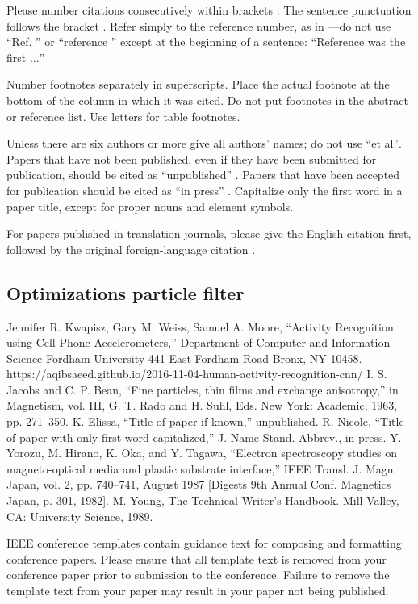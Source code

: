 \documentclass[conference]{IEEEtran}
\begin{document}
Please number citations consecutively within brackets \cite{b1}. The 
sentence punctuation follows the bracket \cite{b2}. Refer simply to the reference 
number, as in \cite{b3}---do not use ``Ref. \cite{b3}'' or ``reference \cite{b3}'' except at 
the beginning of a sentence: ``Reference \cite{b3} was the first $\ldots$''

Number footnotes separately in superscripts. Place the actual footnote at 
the bottom of the column in which it was cited. Do not put footnotes in the 
abstract or reference list. Use letters for table footnotes.

Unless there are six authors or more give all authors' names; do not use 
``et al.''. Papers that have not been published, even if they have been 
submitted for publication, should be cited as ``unpublished'' \cite{b4}. Papers 
that have been accepted for publication should be cited as ``in press'' \cite{b5}. 
Capitalize only the first word in a paper title, except for proper nouns and 
element symbols.

For papers published in translation journals, please give the English 
citation first, followed by the original foreign-language citation \cite{b6}.
\subsection*{Optimizations particle filter}
\begin{thebibliography}{00}
 Jennifer R. Kwapisz, Gary M. Weiss, Samuel A. Moore, ``Activity Recognition using Cell Phone Accelerometers,''  Department of Computer and Information Science  Fordham University  441 East Fordham Road  Bronx, NY 10458.
https://aqibsaeed.github.io/2016-11-04-human-activity-recognition-cnn/
 I. S. Jacobs and C. P. Bean, ``Fine particles, thin films and exchange anisotropy,'' in Magnetism, vol. III, G. T. Rado and H. Suhl, Eds. New York: Academic, 1963, pp. 271--350.
 K. Elissa, ``Title of paper if known,'' unpublished.
 R. Nicole, ``Title of paper with only first word capitalized,'' J. Name Stand. Abbrev., in press.
 Y. Yorozu, M. Hirano, K. Oka, and Y. Tagawa, ``Electron spectroscopy studies on magneto-optical media and plastic substrate interface,'' IEEE Transl. J. Magn. Japan, vol. 2, pp. 740--741, August 1987 [Digests 9th Annual Conf. Magnetics Japan, p. 301, 1982].
 M. Young, The Technical Writer's Handbook. Mill Valley, CA: University Science, 1989.
\end{thebibliography}
\vspace{12pt}
\color{red}
IEEE conference templates contain guidance text for composing and formatting conference papers. Please ensure that all template text is removed from your conference paper prior to submission to the conference. Failure to remove the template text from your paper may result in your paper not being published.
\end{document}
